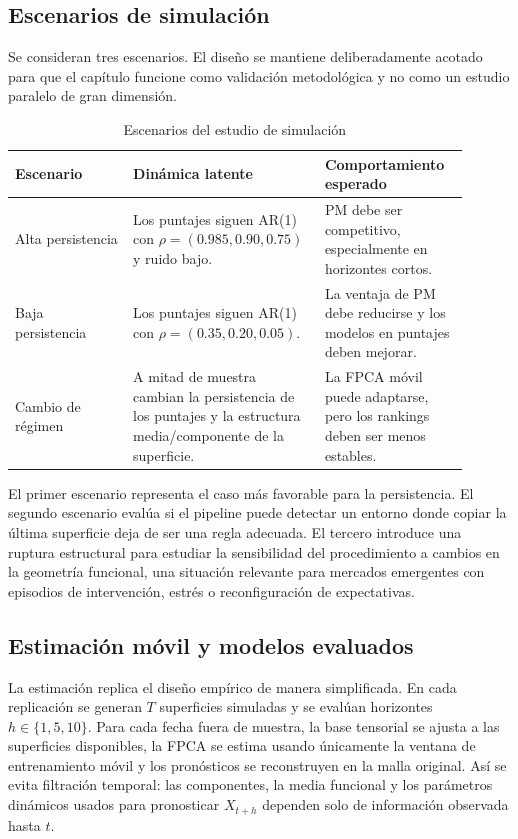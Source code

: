 \documentclass[a4paper,11pt]{article}
\begin{document}
\subsection{Escenarios de simulación}

Se consideran tres escenarios. El diseño se mantiene deliberadamente acotado para que el capítulo funcione como validación metodológica y no como un estudio paralelo de gran dimensión.

\begin{table}[H]
\centering
\caption{Escenarios del estudio de simulación}
\label{tab:sim_scenarios}
\small
\begin{tabular}{p{0.24\linewidth}p{0.39\linewidth}p{0.27\linewidth}}
\toprule
Escenario & Dinámica latente & Comportamiento esperado \\
\midrule
Alta persistencia & Los puntajes siguen AR(1) con \(\rho=(0.985,0.90,0.75)\) y ruido bajo. & PM debe ser competitivo, especialmente en horizontes cortos. \\
Baja persistencia & Los puntajes siguen AR(1) con \(\rho=(0.35,0.20,0.05)\). & La ventaja de PM debe reducirse y los modelos en puntajes deben mejorar. \\
Cambio de régimen & A mitad de muestra cambian la persistencia de los puntajes y la estructura media/componente de la superficie. & La FPCA móvil puede adaptarse, pero los rankings deben ser menos estables. \\
\bottomrule
\end{tabular}
\end{table}

El primer escenario representa el caso más favorable para la persistencia. El segundo escenario evalúa si el pipeline puede detectar un entorno donde copiar la última superficie deja de ser una regla adecuada. El tercero introduce una ruptura estructural para estudiar la sensibilidad del procedimiento a cambios en la geometría funcional, una situación relevante para mercados emergentes con episodios de intervención, estrés o reconfiguración de expectativas.

\subsection{Estimación móvil y modelos evaluados}

La estimación replica el diseño empírico de manera simplificada. En cada replicación se generan \(T\) superficies simuladas y se evalúan horizontes \(h\in\{1,5,10\}\). Para cada fecha fuera de muestra, la base tensorial se ajusta a las superficies disponibles, la FPCA se estima usando únicamente la ventana de entrenamiento móvil y los pronósticos se reconstruyen en la malla original. Así se evita filtración temporal: las componentes, la media funcional y los parámetros dinámicos usados para pronosticar \(X_{t+h}\) dependen solo de información observada hasta \(t\).
\end{document}

